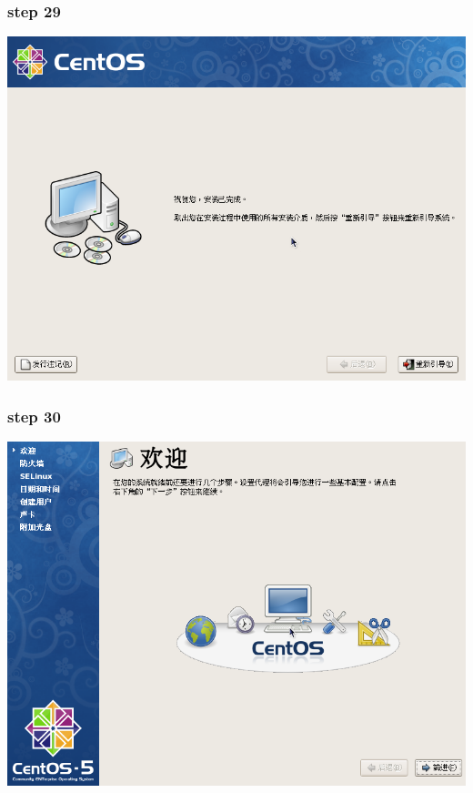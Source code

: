 \documentclass[xcolor=svgnames,presentation]{beamer}
\begin{document}
\begin{frame}
\frametitle{step 29}
\label{sec-2-29}

\begin{center}
\includegraphics[width=.9\linewidth]{img/img44.png}
\end{center}
\end{frame}
\begin{frame}
\frametitle{step 30}
\label{sec-2-30}

\begin{center}
\includegraphics[width=.9\linewidth]{img/img52.png}
\end{center}
\end{frame}
\end{document}
